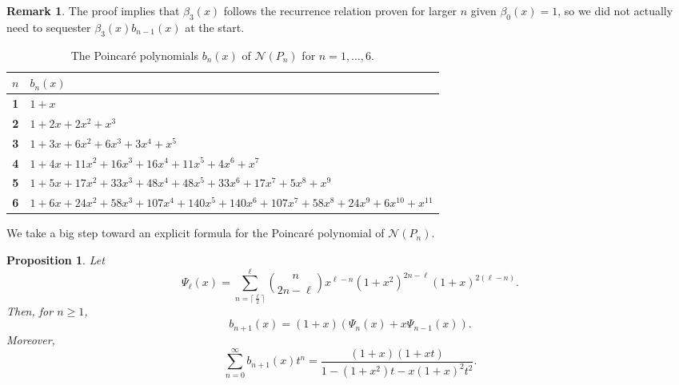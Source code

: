 \documentclass[12pt]{amsart}
\newtheorem{prop}[theorem]{Proposition}
\theoremstyle{definition}
\newtheorem{rem}[theorem]{Remark}
\begin{document}
\begin{rem}
    The proof implies that $\beta_3(x)$ follows the recurrence relation proven for larger $n$ given $\beta_0(x) =1$, so we did not actually  need to sequester $\beta_3(x) b_{n-1}(x)$ at the start.
\end{rem}

\begin{table}[H]
    \centering
    \label{tab:bn_polys}
    \renewcommand{\arraystretch}{1.3}
    \begin{tabular}{c|l}
        \toprule
        \boldmath$n$ & \textbf{$b_n(x)$} \\
        \midrule
        \textbf{1} & $1+x$ \\
        \textbf{2} & $1+2x+2x^2+x^3$ \\
        \textbf{3} & $1+3x+6x^2+6x^3+3x^4+x^5$ \\
        \textbf{4} & $1+4x+11x^2+16x^3+16x^4+11x^5+4x^6+x^7$ \\
        \textbf{5} & $1+5x+17x^2+33x^3+48x^4+48x^5+33x^6+17x^7+5x^8+x^9$ \\
        \textbf{6} & $1+6x+24x^2+58x^3+107x^4+140x^5+140x^6+107x^7+58x^8+24x^9+6x^{10}+x^{11}$ \\
        \bottomrule
    \end{tabular}
    \caption{The Poincar\'e polynomials $b_n(x)$ of $\mathcal N(P_n)$ for $n=1,\ldots,6$.}
\end{table}

We take a big step toward an explicit formula for the Poincar{\'e} polynomial of $\mathcal{N}(P_{n})$.

\begin{prop}\label{PoincarePolyFormula}
    Let \[\Psi_\ell(x)=  \sum_{n=\lceil\frac{\ell}{2}\rceil }^\ell \binom{n}{2n-\ell} x^{\ell-n} (1+x^2)^{2n-\ell} (1+x)^{2(\ell-n)}.\] Then, for $n \geq 1$, 
    \[
    b_{n+1}(x) =(1+x) \left(\Psi_n(x) + x \Psi_{n-1}(x)\right). 
    \]
    Moreover,
    \begin{equation}\label{eq:53tris}
    \sum_{n=0}^\infty b_{n+1}(x)t^n = \frac{(1+x)(1+xt)}{1-(1+x^2)t-x(1+x)^2t^2}.
    \end{equation}
\end{prop}
\end{document}
